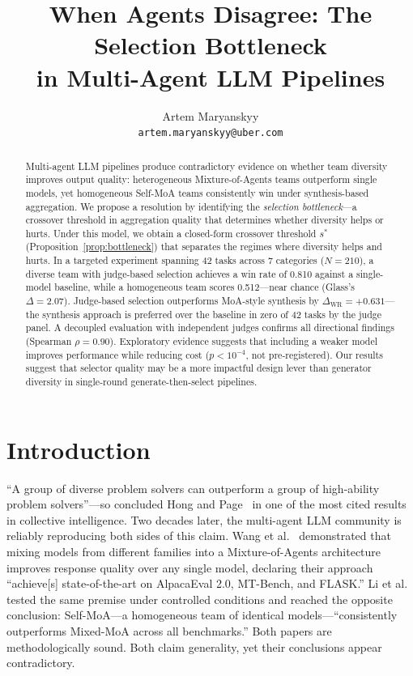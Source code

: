 \documentclass[10pt,twocolumn]{article}
\title{When Agents Disagree: The Selection Bottleneck\\in Multi-Agent LLM Pipelines}
\author{
  Artem Maryanskyy\\
  \texttt{artem.maryanskyy@uber.com}
}
\date{}
\theoremstyle{remark}
\begin{document}
\maketitle

\begin{abstract}
Multi-agent LLM pipelines produce contradictory evidence on whether team diversity improves output quality: heterogeneous Mixture-of-Agents teams outperform single models, yet homogeneous Self-MoA teams consistently win under synthesis-based aggregation.
We propose a resolution by identifying the \textit{selection bottleneck}---a crossover threshold in aggregation quality that determines whether diversity helps or hurts.
Under this model, we obtain a closed-form crossover threshold $s^*$ (Proposition~\ref{prop:bottleneck}) that separates the regimes where diversity helps and hurts.
In a targeted experiment spanning 42 tasks across 7 categories ($N = 210$), a diverse team with judge-based selection achieves a win rate of 0.810 against a single-model baseline, while a homogeneous team scores 0.512---near chance (Glass's $\Delta = 2.07$).
Judge-based selection outperforms MoA-style synthesis by $\Delta_{\mathrm{WR}} = +0.631$---the synthesis approach is preferred over the baseline in zero of 42 tasks by the judge panel.
A decoupled evaluation with independent judges confirms all directional findings (Spearman $\rho = 0.90$).
Exploratory evidence suggests that including a weaker model improves performance while reducing cost ($p < 10^{-4}$, not pre-registered).
Our results suggest that selector quality may be a more impactful design lever than generator diversity in single-round generate-then-select pipelines.
\end{abstract}

\section{Introduction}
\label{sec:intro}

``A group of diverse problem solvers can outperform a group of high-ability problem solvers''---so concluded Hong and Page~\cite{hong2004groups} in one of the most cited results in collective intelligence. Two decades later, the multi-agent LLM community is reliably reproducing both sides of this claim. Wang et al.~\cite{wang2024mixture} demonstrated that mixing models from different families into a Mixture-of-Agents architecture improves response quality over any single model, declaring their approach ``achieve[s] state-of-the-art on AlpacaEval 2.0, MT-Bench, and FLASK.'' Li et al.~\cite{li2025self} tested the same premise under controlled conditions and reached the opposite conclusion: Self-MoA---a homogeneous team of identical models---``consistently outperforms Mixed-MoA across all benchmarks.'' Both papers are methodologically sound. Both claim generality, yet their conclusions appear contradictory.
\end{document}

